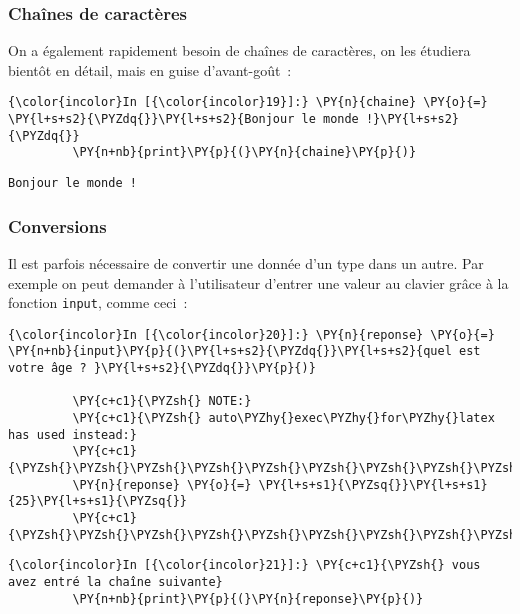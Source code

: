     \hypertarget{chauxeenes-de-caractuxe8res}{%
\subsubsection{Chaînes de
caractères}\label{chauxeenes-de-caractuxe8res}}

    On a également rapidement besoin de chaînes de caractères, on les
étudiera bientôt en détail, mais en guise d'avant-goût~:

    \begin{Verbatim}[commandchars=\\\{\}]
{\color{incolor}In [{\color{incolor}19}]:} \PY{n}{chaine} \PY{o}{=} \PY{l+s+s2}{\PYZdq{}}\PY{l+s+s2}{Bonjour le monde !}\PY{l+s+s2}{\PYZdq{}}
         \PY{n+nb}{print}\PY{p}{(}\PY{n}{chaine}\PY{p}{)}
\end{Verbatim}


    \begin{Verbatim}[commandchars=\\\{\}]
Bonjour le monde !

    \end{Verbatim}

    \hypertarget{conversions}{%
\subsubsection{Conversions}\label{conversions}}

    Il est parfois nécessaire de convertir une donnée d'un type dans un
autre. Par exemple on peut demander à l'utilisateur d'entrer une valeur
au clavier grâce à la fonction \texttt{input}, comme ceci~:

    \begin{Verbatim}[commandchars=\\\{\}]
{\color{incolor}In [{\color{incolor}20}]:} \PY{n}{reponse} \PY{o}{=} \PY{n+nb}{input}\PY{p}{(}\PY{l+s+s2}{\PYZdq{}}\PY{l+s+s2}{quel est votre âge ? }\PY{l+s+s2}{\PYZdq{}}\PY{p}{)}
         
         \PY{c+c1}{\PYZsh{} NOTE:}
         \PY{c+c1}{\PYZsh{} auto\PYZhy{}exec\PYZhy{}for\PYZhy{}latex has used instead:}
         \PY{c+c1}{\PYZsh{}\PYZsh{}\PYZsh{}\PYZsh{}\PYZsh{}\PYZsh{}\PYZsh{}\PYZsh{}\PYZsh{}\PYZsh{}}
         \PY{n}{reponse} \PY{o}{=} \PY{l+s+s1}{\PYZsq{}}\PY{l+s+s1}{25}\PY{l+s+s1}{\PYZsq{}}
         \PY{c+c1}{\PYZsh{}\PYZsh{}\PYZsh{}\PYZsh{}\PYZsh{}\PYZsh{}\PYZsh{}\PYZsh{}\PYZsh{}\PYZsh{}}
\end{Verbatim}


    \begin{Verbatim}[commandchars=\\\{\}]
{\color{incolor}In [{\color{incolor}21}]:} \PY{c+c1}{\PYZsh{} vous avez entré la chaîne suivante}
         \PY{n+nb}{print}\PY{p}{(}\PY{n}{reponse}\PY{p}{)}
\end{Verbatim}


